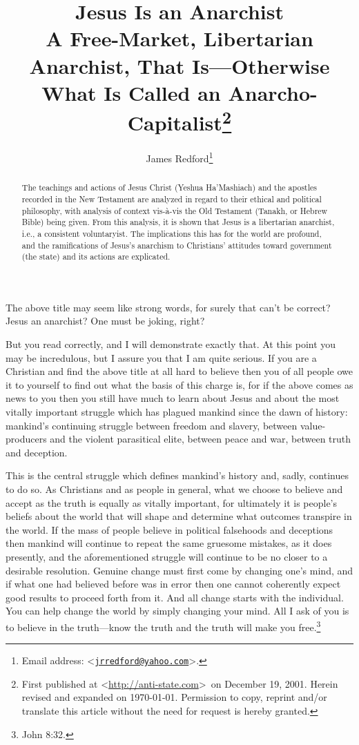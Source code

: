 \documentclass[letterpaper,12pt]{article}
\title{Jesus Is an Anarchist\\
\Large
\vspace{1em}
A Free-Market, Libertarian Anarchist, That Is---Otherwise What Is Called an Anarcho-Capitalist\footnote{First published at \textless\url{http://anti-state.com}\textgreater\ on December 19, 2001. Herein revised and expanded on \today . Permission to copy, reprint and/or translate this article without the need for request is hereby granted.}}
\author{James Redford\footnote{Email address: \textless\href{mailto:jrredford@yahoo.com}{\nolinkurl{jrredford@yahoo.com}}\textgreater .}}
\begin{document}
\maketitle

\renewcommand{\abstractname}{\textsc{Abstract}}
\setlength{\absparindent}{0.5em}
\begin{abstract}
The teachings and actions of Jesus Christ (Yeshua Ha'Mashiach) and the apostles recorded in the New Testament are analyzed in regard to their ethical and political philosophy, with analysis of context vis-\`{a}-vis the Old Testament (Tanakh, or Hebrew Bible) being given. From this analysis, it is shown that Jesus is a libertarian anarchist, i.e., a consistent voluntaryist. The implications this has for the world are profound, and the ramifications of Jesus's anarchism to Christians' attitudes toward government (the state) and its actions are explicated.
\end{abstract}

The above title may seem like strong words, for surely that can't be correct? Jesus an anarchist? One must be joking, right?

But you read correctly, and I will demonstrate exactly that. At this point you may be incredulous, but I assure you that I am quite serious. If you are a Christian and find the above title at all hard to believe then you of all people owe it to yourself to find out what the basis of this charge is, for if the above comes as news to you then you still have much to learn about Jesus and about the most vitally important struggle which has plagued mankind since the dawn of history: mankind's continuing struggle between freedom and slavery, between value-producers and the violent parasitical elite, between peace and war, between truth and deception.

This is the central struggle which defines mankind's history and, sadly, continues to do so. As Christians and as people in general, what we choose to believe and accept as the truth is equally as vitally important, for ultimately it is people's beliefs about the world that will shape and determine what outcomes transpire in the world. If the mass of people believe in political falsehoods and deceptions then mankind will continue to repeat the same gruesome mistakes, as it does presently, and the aforementioned struggle will continue to be no closer to a desirable resolution. Genuine change must first come by changing one's mind, and if what one had believed before was in error then one cannot coherently expect good results to proceed forth from it. And all change starts with the individual. You can help change the world by simply changing your mind. All I ask of you is to believe in the truth---know the truth and the truth will make you free.\footnote{John 8:32.}
\end{document}
